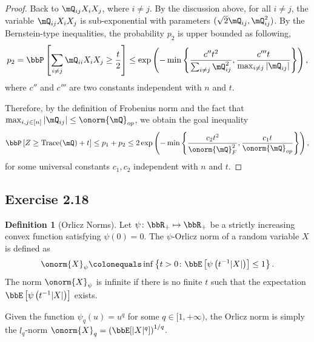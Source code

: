 \documentclass[11pt]{article}
\DeclareMathOperator{\tr}{Trace}
\newcommand{\of}[1]{\left(#1\right)}
\newcommand{\off}[1]{\left[#1\right]}
\newcommand{\offf}[1]{\left\{#1\right\}}
\theoremstyle{plain}
\theoremstyle{definition}
\newtheorem{defn}{Definition}
\begin{document}
\begin{proof}
    	\vspace{0.2cm}
    	Back to $\mQ_{ij} X_i X_j$, where $i \neq j$. By the discussion above, for all $i\neq j$, the variable $\mQ_{ij} X_i X_j$ is sub-exponential with parameters $(\sqrt{2} \mQ_{ij}, \mQ_{ij}^2)$. By the Bernstein-type inequalities, the probability $p_2$ is upper bounded as following,
    	\begin{equation}
    		p_2 = \bbP \off{ \sum_{i \neq j} \mQ_{ii} X_i X_j  \geq \frac{t}{2}} \leq \exp \of{ - \min \offf{  \frac{c'' t^2}{\sum_{i\neq j} \mQ^2_{ij} }, \frac{c'''t}{\max_{i\neq j   }|\mQ_{ij}| } }},
    	\end{equation}
    	where $c''$ and $c'''$ are two constants independent with $n$ and $t$.
    	
    	\vspace{0.2cm}
    	
    	Therefore, by the definition of Frobenius norm and the fact that $\max_{i,j\in[n]}|\mQ_{ij}| \leq \onorm{\mQ}_{op} $, we obtain the goal inequality
    	\begin{equation}
    		\bbP \off{ Z \geq \tr(\mQ) +  t } \leq p_1 + p_2 \leq 2\exp \of{ - \min \offf{  \frac{c_2 t^2}{\onorm{\mQ}^2_F}, \frac{c_1t}{\onorm{\mQ}_{op} }} },
    	\end{equation}
    	for some universal constants $c_1,c_2$ independent with $n$ and $t$.
    \end{proof}
    
    \subsection{Exercise 2.18}
    
    \begin{defn}[Orlicz Norms]\label{def:orlicz}
     Let $\psi \colon \bbR_+ \mapsto \bbR_+$ be a strictly increasing convex function satisfying $\psi(0) = 0$. The $\psi$-Orlicz norm of a random variable $X$ is defined as
    \begin{equation}
    	\onorm{X}_{\psi} \colonequals \inf \offf{t > 0\colon \bbE\off{\psi \of{t^{-1} |X| } } \leq 1  }.
    \end{equation}
    The norm $\onorm{X}_{\psi}$ is infinite if there is no finite $t$ such that the expectation $ \bbE\off{\psi \of{t^{-1} |X| } }$ exists.
    \end{defn}
    
     Given the function $\psi_q(u) = u^{q}$ for some $q \in [1,+\infty)$, the Orlicz norm is simply the $l_q$-norm $\onorm{X}_q = \of{ \bbE[|X|^q] }^{1/q}$.
\end{document}
